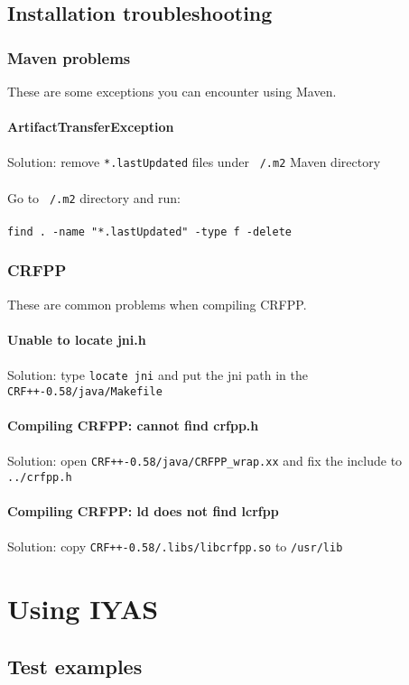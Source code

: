 \documentclass{wileysev}
\begin{document}
\section[Installation troubleshooting]{Installation troubleshooting}
\subsection[Maven problems]{Maven problems}

These are some exceptions you can encounter using Maven. 
\\\\
\textbf{ArtifactTransferException}
\\\\
Solution: remove \texttt{*.lastUpdated} files under \texttt{~/.m2} Maven directory
\\\\
Go to \texttt{~/.m2} directory and run:
\\\\
\texttt{find . -name "*.lastUpdated" -type f -delete}


\subsection[CRFPP]{CRFPP}

These are common problems when compiling CRFPP.
\\\\
\textbf{Unable to locate jni.h}
\\\\
Solution: type \texttt{locate jni} and put the jni path in the \texttt{CRF++-0.58/java/Makefile}
\\\\
\textbf{Compiling CRFPP: cannot find crfpp.h}
\\\\
Solution: open \texttt{CRF++-0.58/java/CRFPP\_wrap.xx} and fix the include to \texttt{../crfpp.h}
\\\\
\textbf{Compiling CRFPP: ld does not find lcrfpp}
\\\\
Solution: copy \texttt{CRF++-0.58/.libs/libcrfpp.so} to \texttt{/usr/lib}

\chapter[Using IYAS]{Using IYAS}

\section{Test examples}
\end{document}
